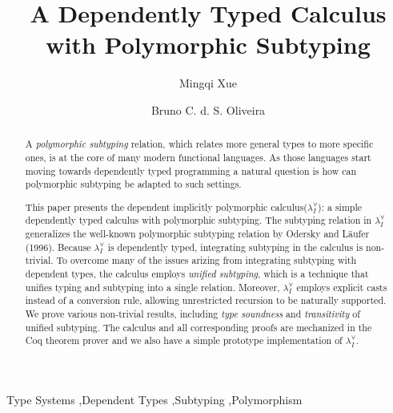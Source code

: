 \documentclass{elsarticle}
\title{A Dependently Typed Calculus with Polymorphic Subtyping}
\author{Mingqi Xue}
\author{Bruno C. d. S. Oliveira}
\newcommand{\system}[0]{the dependent implicitly polymorphic calculus\xspace}
\newcommand{\name}[0]{$\lambda_{I}^{\forall}$\xspace}
\begin{document}
\begin{abstract}
  A \emph{polymorphic subtyping} relation, which relates more general types
  to more specific ones, is at the core of many modern functional languages.
  As those languages start moving towards dependently typed programming a
  natural question is how can polymorphic subtyping be adapted to such settings.

  This paper presents \system (\name): a simple dependently typed calculus
  with polymorphic subtyping. The subtyping relation in \name
  generalizes the well-known polymorphic subtyping relation by
  Odersky and L\"aufer (1996). Because \name is dependently typed,
  integrating subtyping in the calculus is non-trivial. To overcome
  many of the issues arizing from integrating subtyping with dependent
  types, the calculus employs \emph{unified subtyping}, which is a technique
  that unifies typing and subtyping into a single relation. Moreover, \name
  employs explicit casts instead of a conversion rule, allowing
  unrestricted recursion to be naturally supported.
  We prove various non-trivial results, including \emph{type soundness} and \emph{transitivity}
  of unified subtyping. The calculus and all corresponding proofs
  are mechanized in the Coq theorem prover and we also have a simple prototype
  implementation of \name.
\end{abstract}


\begin{keyword}
  Type Systems \sep Dependent Types \sep Subtyping \sep Polymorphism
\end{keyword}

\maketitle








% 


\end{document}
